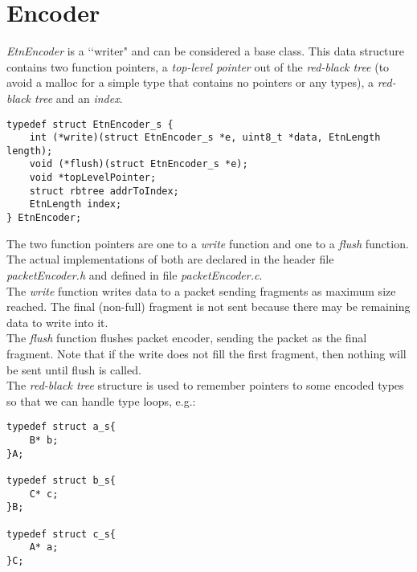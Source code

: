 


\section*{Encoder}
\emph{EtnEncoder} is a \lq\lq writer" and can be considered a base class. This data structure contains two function pointers, a \emph{top-level pointer} out of the \emph{red-black tree} (to avoid a malloc for a simple type that contains no pointers or any types), a \emph{red-black tree} and an \emph{index}.
\begin{lstlisting}
typedef struct EtnEncoder_s {
	int (*write)(struct EtnEncoder_s *e, uint8_t *data, EtnLength length);
	void (*flush)(struct EtnEncoder_s *e);
	void *topLevelPointer;
	struct rbtree addrToIndex;
	EtnLength index;
} EtnEncoder;
\end{lstlisting}
The two function pointers are one to a \emph{write} function and one to a \emph{flush} function. The actual implementations of both are declared in the header file \emph{packetEncoder.h} and defined in file \emph{packetEncoder.c}.\\
The \emph{write} function  writes data to a packet sending fragments as maximum size reached. The final (non-full) fragment is not sent because there may be remaining data to write into it.\\
The \emph{flush} function flushes packet encoder, sending the packet as the final fragment. Note that if the write does not fill the first fragment, then nothing will be sent until flush is called.\\
The \emph{red-black tree} structure is used to remember pointers to some encoded types so that we can handle type loops, e.g.:
\begin{lstlisting}
typedef struct a_s{
	B* b;
}A;

typedef struct b_s{
	C* c;
}B;

typedef struct c_s{
	A* a;
}C;
\end{lstlisting}

